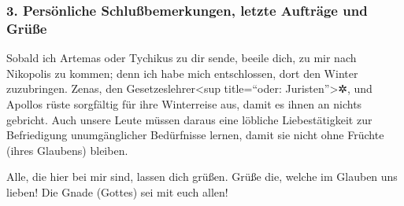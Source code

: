 \hypertarget{persuxf6nliche-schluuxdfbemerkungen-letzte-auftruxe4ge-und-gruxfcuxdfe}{%
\subsubsection{3. Persönliche Schlußbemerkungen, letzte Aufträge und
Grüße}\label{persuxf6nliche-schluuxdfbemerkungen-letzte-auftruxe4ge-und-gruxfcuxdfe}}

 Sobald ich Artemas oder Tychikus zu dir sende, beeile
dich, zu mir nach Nikopolis zu kommen; denn ich habe mich entschlossen,
dort den Winter zuzubringen.  Zenas, den
Gesetzeslehrer\textless sup title=``oder: Juristen''\textgreater✲, und
Apollos rüste sorgfältig für ihre Winterreise aus, damit es ihnen an
nichts gebricht.  Auch unsere Leute müssen daraus eine
löbliche Liebestätigkeit zur Befriedigung unumgänglicher Bedürfnisse
lernen, damit sie nicht ohne Früchte (ihres Glaubens) bleiben.

 Alle, die hier bei mir sind, lassen dich grüßen. Grüße
die, welche im Glauben uns lieben! Die Gnade (Gottes) sei mit euch
allen!
